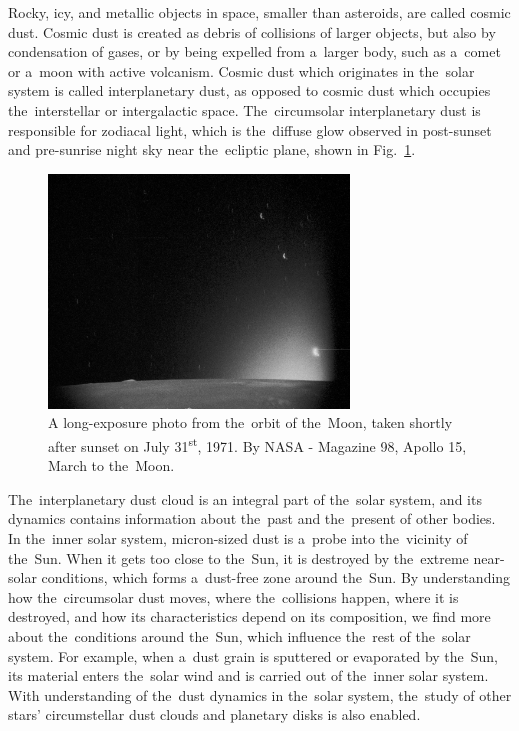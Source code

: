 
Rocky, icy, and metallic objects in space, smaller than asteroids, are called cosmic dust. Cosmic dust is created as debris of collisions of larger objects, but also by condensation of gases, or by being expelled from a~larger body, such as a~comet or a~moon with active volcanism. Cosmic dust which originates in the~solar system is called interplanetary dust, as opposed to cosmic dust which occupies the~interstellar or intergalactic space. The~circumsolar interplanetary dust is responsible for zodiacal light, which is the~diffuse glow observed in post-sunset and pre-sunrise night sky near the~ecliptic plane, shown in Fig.~\ref{fig:zodiacal_light}.

\begin{figure}[t]
 	\centering
 	\includegraphics[width=8cm]{figures/zodiacal_light.jpg}
 	\caption{A long-exposure photo from the~orbit of the~Moon, taken shortly after sunset on July 31\textsuperscript{st}, 1971. By NASA - Magazine 98, Apollo 15, March to the~Moon.}
 	\label{fig:zodiacal_light}
\end{figure}

The~interplanetary dust cloud is an integral part of the~solar system, and its dynamics contains information about the~past and the~present of other bodies. In the~inner solar system, micron-sized dust is a~probe into the~vicinity of the~Sun. When it gets too close to the~Sun, it is destroyed by the~extreme near-solar conditions, which forms a~dust-free zone around the~Sun. By understanding how the~circumsolar dust moves, where the~collisions happen, where it is destroyed, and how its characteristics depend on its composition, we find more about the~conditions around the~Sun, which influence the~rest of the~solar system. For example, when a~dust grain is sputtered or evaporated by the~Sun, its material enters the~solar wind and is carried out of the~inner solar system. With understanding of the~dust dynamics in the~solar system, the~study of other stars' circumstellar dust clouds and planetary disks is also enabled.

